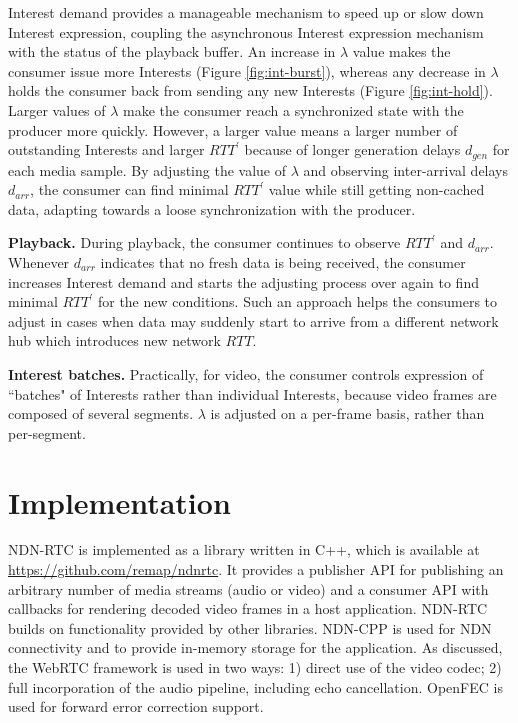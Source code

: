 \documentclass{icn/sig-alternate-2013} %
\newcommand{\ndnrtcName}{NDN-RTC} %
\newcommand{\wConcept}{Interest demand}
\begin{document}
\wConcept{} provides a manageable mechanism to speed up or slow down Interest expression, coupling the asynchronous Interest expression mechanism with the status of the playback buffer. An increase in $\lambda$ value makes the consumer issue more Interests (Figure \ref{fig:int-burst}), whereas any decrease in $\lambda$ holds the consumer back from sending any new Interests (Figure \ref{fig:int-hold}). Larger values of $\lambda$ make the consumer reach a synchronized state with the producer more quickly. However, a larger value means a larger number of outstanding Interests and larger $RTT^\prime$ because of longer generation delays $d_{gen}$ for each media sample. By adjusting the value of $\lambda$ and observing inter-arrival delays $d_{arr}$, the consumer can find minimal $RTT^\prime$ value while still getting non-cached data, adapting towards a loose synchronization with the producer.

\textbf{Playback.}  During playback, the consumer continues to observe $RTT^\prime$ and $d_{arr}$. Whenever $d_{arr}$ indicates that no fresh data is being received, the consumer increases \wConcept{} and starts the adjusting process over again to find minimal $RTT^\prime$ for the new conditions. Such an approach helps the consumers to adjust in cases when data may suddenly start to arrive from a different network hub which introduces new network $RTT$.

\textbf{Interest batches.} Practically, for video, the consumer controls expression of ``batches" of Interests rather than individual Interests, because video frames are composed of several segments.  $\lambda$ is adjusted on a per-frame basis, rather than per-segment. 

\section{Implementation}
\label{sec:imp}
\ndnrtcName{} is implemented as a library written in C++, which is available at \url{https://github.com/remap/ndnrtc}. 
It provides a publisher API for publishing an arbitrary number of media streams (audio or video) and a consumer API with callbacks for rendering decoded video frames in a host application. \ndnrtcName{} builds on functionality provided by other libraries. NDN-CPP \cite{ndnccl} is used for NDN connectivity and to provide in-memory storage for the application. As discussed, the WebRTC framework \cite{webrtc} is used in two ways: 1) direct use of the video codec; 2) full incorporation of the audio pipeline, including echo cancellation. OpenFEC \cite{openfec} is used for forward error correction support. 
\end{document}
